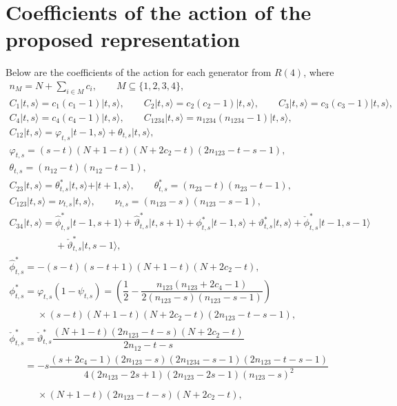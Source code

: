 \documentclass[10pt,a4paper]{amsart}
\numberwithin{equation}{section}
\begin{document}
\section{Coefficients of the action of the proposed representation}\label{AppCoeff}
Below are the coefficients of the action for each generator from $R(4)$, where
\begin{gather*}
n_M=N+\sum_{i\in M}c_i,\qquad M\subseteq\lbrace1,2,3,4\rbrace,
\\
C_1\vert t,s\rangle =c_1(c_1-1)\vert t,s\rangle,
\qquad
C_2\vert t,s\rangle =c_2(c_2-1)\vert t,s\rangle,
\qquad
C_3\vert t,s\rangle =c_3(c_3-1)\vert t,s\rangle,
\\
C_4\vert t,s\rangle =c_4(c_4-1)\vert t,s\rangle,
\qquad
C_{1234}\vert t,s\rangle =n_{1234}(n_{1234}-1)\vert t,s\rangle,
\\
C_{12}\vert t,s\rangle =\varphi_{t,s}\vert t-1,s\rangle+\theta_{t,s}\vert t,s\rangle,\\
\varphi_{t,s}=(s-t)(N+1-t)(N+2c_2-t)(2n_{123}-t-s-1),\\
\theta_{t,s}=(n_{12}-t)(n_{12}-t-1),
\\
C_{23}\vert t,s\rangle=\theta^*_{t,s}\vert t,s\rangle+\vert t+1,s\rangle,\qquad
\theta^*_{t,s}=(n_{23}-t)(n_{23}-t-1),
\\
C_{123}\vert t,s\rangle =\nu_{t,s}\vert t,s\rangle,\qquad
\nu_{t,s}=(n_{123}-s)(n_{123}-s-1),
\\
C_{34}\vert t,s\rangle =\hat{\phi}^*_{t,s}\vert t-1,s+1\rangle+\hat{\vartheta}^*_{t,s}\vert t,s+1\rangle
+\phi^*_{t,s}\vert t-1,s\rangle+\vartheta^*_{t,s}\vert t,s\rangle
+\check{\phi}^*_{t,s}\vert t-1,s-1\rangle\\
\phantom{C_{34}\vert t,s\rangle =}{}+\check{\vartheta}^*_{t,s}\vert t,s-1\rangle,\\
\hat{\phi}^*_{t,s}=-(s-t)(s-t+1)(N+1-t)(N+2c_2-t),\\
\phi^*_{t,s}=\varphi_{t,s}(1-\psi_{t,s})=\left(\dfrac{1}{2}-\dfrac{n_{123}(n_{123}+2c_4-1)}{2(n_{123}-s)(n_{123}-s-1)}\right)\\
\phantom{\phi^*_{t,s}=}{}\times(s-t)(N+1-t)(N+2c_2-t)(2n_{123}-t-s-1),\\
\check{\phi}^*_{t,s}=\check{\vartheta}_{t,s}^*\dfrac{(N+1-t)(2n_{123}-t-s)(N+2c_2-t)}{2n_{12}-t-s}\\
\phantom{\check{\phi}^*_{t,s}}{}=-s\dfrac{(s+2c_4-1)(2n_{123}-s)(2n_{1234}-s-1)(2n_{123}-t-s-1)}{4(2n_{123}-2s+1)(2n_{123}-2s-1)(n_{123}-s)^2}\\
\phantom{\check{\phi}^*_{t,s}=}{} \times(N+1-t)(2n_{123}-t-s)(N+2c_2-t),\\

\end{gather*}
\end{document}
